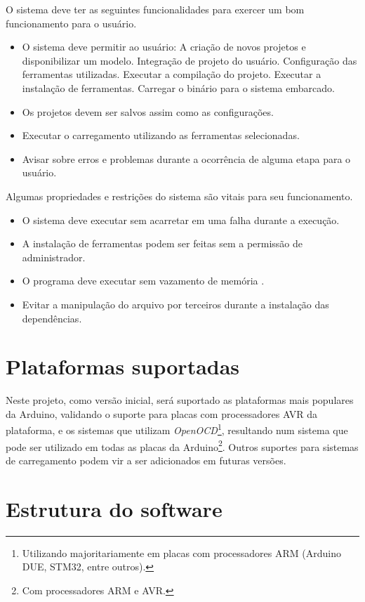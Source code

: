 O sistema deve ter as seguintes funcionalidades para exercer um bom funcionamento para o usuário.
\begin{itemize}
\item O sistema deve permitir ao usuário:
	\subitem A criação de novos projetos e disponibilizar um modelo.
	\subitem Integração de projeto do usuário.
    \subitem Configuração das ferramentas utilizadas.
	\subitem Executar a compilação do projeto.
	\subitem Executar a instalação de ferramentas.
	\subitem Carregar o binário para o sistema embarcado.
\item Os projetos devem ser salvos assim como as configurações.
\item Executar o carregamento utilizando as ferramentas selecionadas.
\item Avisar sobre erros e problemas durante a ocorrência de alguma etapa para o usuário.	
\end{itemize}

Algumas propriedades e restrições do sistema são vitais para seu funcionamento.
\begin{itemize}
\item O sistema deve executar sem acarretar em uma falha durante a execução.
\item A instalação de ferramentas podem ser feitas sem a permissão de administrador.
\item O programa deve executar sem vazamento de memória \cite{Patterson:2008:COD:1502247}.
\item Evitar a manipulação do arquivo por terceiros durante a instalação das dependências.
\end{itemize}

\section{Plataformas suportadas}

Neste projeto, como versão inicial, será suportado as plataformas mais populares da Arduino, validando o suporte para placas com processadores AVR da plataforma, e os sistemas que utilizam \textit{OpenOCD}\footnote{Utilizando majoritariamente em placas com processadores ARM (Arduino DUE, STM32, entre outros).}, resultando num sistema que pode ser utilizado em todas as placas da Arduino\footnote{Com processadores ARM e AVR.}. Outros suportes para sistemas de carregamento podem vir a ser adicionados em futuras versões.


\section{Estrutura do software}

